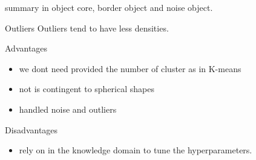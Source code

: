 \documentclass{beamer}
\begin{document}
\begin{frame}
summary in object core,  border object and noise object.
\end{frame}




\begin{frame}{Outliers}
Outliers tend to have less densities.
\end{frame}




\begin{frame}{Advantages}
\begin{itemize}
\item we dont need provided the number of cluster as in K-means
\item not is contingent to spherical shapes
\item handled noise  and outliers
\end{itemize}
\end{frame}



\begin{frame}{Disadvantages}
\begin{itemize}
\item rely on in the knowledge domain to tune the hyperparameters.
\end{itemize}
\end{frame}
\end{document}
